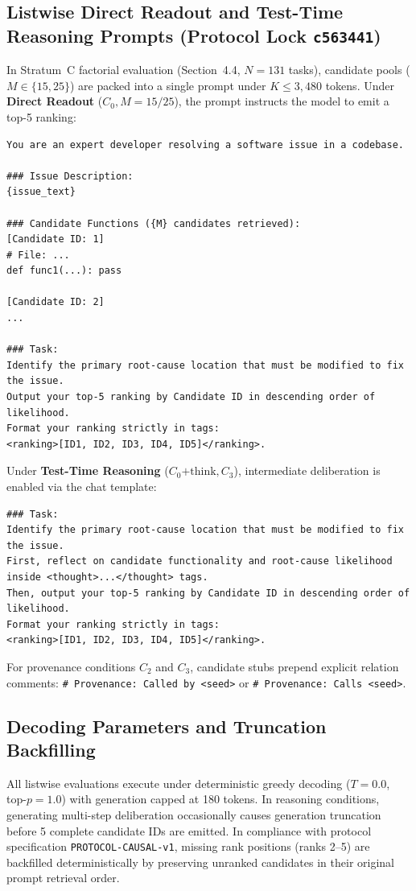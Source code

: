\documentclass[10pt]{article}
\begin{document}
\subsection{Listwise Direct Readout and Test-Time Reasoning Prompts (Protocol Lock \texttt{c563441})}
In Stratum~C factorial evaluation (Section~4.4, $N=131$ tasks), candidate pools ($M \in \{15, 25\}$) are packed into a single prompt under $K \le 3{,}480$ tokens. Under \textbf{Direct Readout} ($C_0, M=15/25$), the prompt instructs the model to emit a top-5 ranking:
\begin{lstlisting}[basicstyle=\ttfamily\scriptsize,breaklines=true]
You are an expert developer resolving a software issue in a codebase.

### Issue Description:
{issue_text}

### Candidate Functions ({M} candidates retrieved):
[Candidate ID: 1]
# File: ...
def func1(...): pass

[Candidate ID: 2]
...

### Task:
Identify the primary root-cause location that must be modified to fix the issue.
Output your top-5 ranking by Candidate ID in descending order of likelihood.
Format your ranking strictly in tags:
<ranking>[ID1, ID2, ID3, ID4, ID5]</ranking>.
\end{lstlisting}
Under \textbf{Test-Time Reasoning} ($C_0\text{+think}, C_3$), intermediate deliberation is enabled via the chat template:
\begin{lstlisting}[basicstyle=\ttfamily\scriptsize,breaklines=true]
### Task:
Identify the primary root-cause location that must be modified to fix the issue.
First, reflect on candidate functionality and root-cause likelihood
inside <thought>...</thought> tags.
Then, output your top-5 ranking by Candidate ID in descending order of likelihood.
Format your ranking strictly in tags:
<ranking>[ID1, ID2, ID3, ID4, ID5]</ranking>.
\end{lstlisting}
For provenance conditions $C_2$ and $C_3$, candidate stubs prepend explicit relation comments: \texttt{\# Provenance: Called by <seed>} or \texttt{\# Provenance: Calls <seed>}.

\subsection{Decoding Parameters and Truncation Backfilling}
All listwise evaluations execute under deterministic greedy decoding ($T = 0.0$, top-$p = 1.0$) with generation capped at 180 tokens. In reasoning conditions, generating multi-step deliberation occasionally causes generation truncation before 5 complete candidate IDs are emitted. In compliance with protocol specification \texttt{PROTOCOL-CAUSAL-v1}, missing rank positions (ranks 2--5) are backfilled deterministically by preserving unranked candidates in their original prompt retrieval order.
\end{document}
